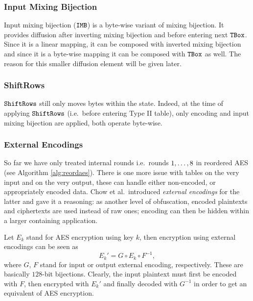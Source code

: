 
\subsubsection{Input Mixing Bijection}
	
	Input mixing bijection ($\texttt{IMB}$) is a byte-wise variant of mixing bijection. It provides diffusion after inverting mixing bijection and before entering next $\texttt{TBox}$. Since it is a linear mapping, it can be composed with inverted mixing bijection and since it is a byte-wise mapping it can be composed with $\texttt{TBox}$ as well. The reason for this smaller diffusion element will be given later.

\subsubsection{ShiftRows}
	
	$\texttt{ShiftRows}$ still only moves bytes within the state. Indeed, at the time of applying $\texttt{ShiftRows}$ (i.e.\ before entering Type II table), only encoding and input mixing bijection are applied, both operate byte-wise.

\subsubsection{External Encodings}
	
	So far we have only treated internal rounds i.e.\ rounds $1 , \ldots , 8$ in reordered AES (see Algorithm \ref{alg:reordaes}). There is one more issue with tables on the very input and on the very output, these can handle either non-encoded, or appropriately encoded data. Chow et al.\ introduced {\em external encodings} for the latter and gave it a reasoning: as another level of obfuscation, encoded plaintexts and ciphertexts are used instead of raw ones; encoding can then be hidden within a larger containing application. %
	
	Let $E_k$ stand for AES encryption using key $k$, then encryption using external encodings can be seen as
	\begin{equation}
		E_k' = G \circ E_k \circ F^{-1} ,
	\end{equation}
	where $G$, $F$ stand for input or output external encoding, respectively. These are basically $128$-bit bijections. Clearly, the input plaintext must first be encoded with $F$, then encrypted with $E_k'$ and finally decoded with $G^{-1}$ in order to get an equivalent of AES encryption.
	
